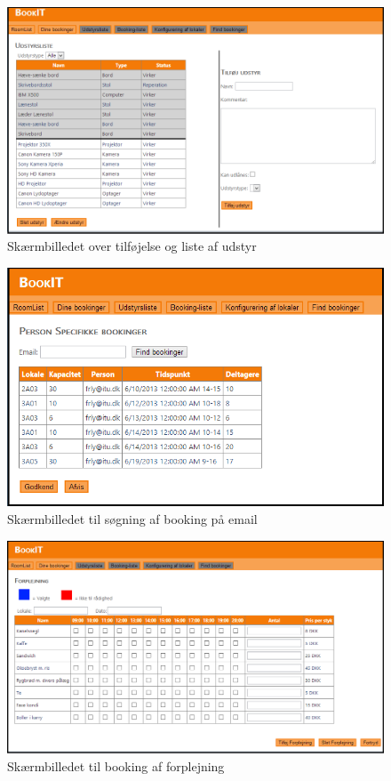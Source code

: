\begin{figure}[h!]
  \centering
    \includegraphics[angle=90, height=0.9\textheight]{Appendix/GUI-Prototype/DigitalMockup/UdstyrsListe}
  \caption{Skærmbilledet over tilføjelse og liste af udstyr}
\label{App_GUI_final_UdstyrsListe}
\end{figure}

\begin{figure}[h!]
  \centering
    \includegraphics[angle=90, height=0.9\textheight]{Appendix/GUI-Prototype/DigitalMockup/SpecifikBookingListe}
  \caption{Skærmbilledet til søgning af booking på email}
\label{App_GUI_final_SpecifikBookingListe}
\end{figure}

\begin{figure}[h!]
  \centering
    \includegraphics[angle=90, height=0.9\textheight]{Appendix/GUI-Prototype/DigitalMockup/Forplejning}
  \caption{Skærmbilledet til booking af forplejning}
\label{App_GUI_final_Forplejning}
\end{figure}

